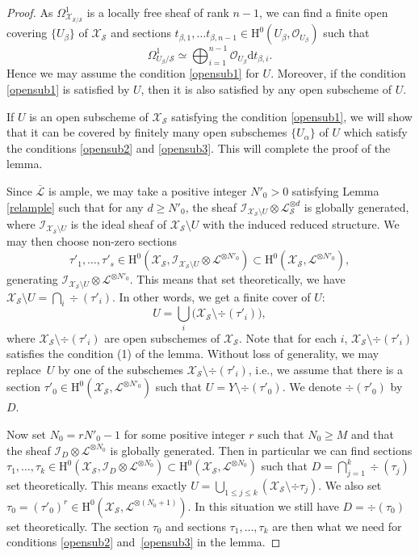 \documentclass[11pt]{article}
\newcommand{\ie}{i.e.,\xspace}
\numberwithin{equation}{section}
\theoremstyle{plain}
\theoremstyle{definition}
\newcommand{\ho}{\mathrm{H}}
\newcommand{\X}{\mathcal{X}}
\newcommand{\Li}{\overline{\mathcal{L}}{}}
\newcommand{\li}{\mathcal{L}}
\begin{document}
\begin{proof}[Proof]
As $\Omega^1_{\X_{\mathcal{S}/\mathcal{S}}}$ is a locally free sheaf of rank $n-1$,
we can find a finite open covering $\{U_{\beta}\}$ of $\X_{\mathcal{S}}$ and sections $t_{\beta,1},\dots t_{\beta,n-1}\in \ho^0(U_{\beta}, \mathcal{O}_{U_{\beta}})$ such that
\[
\Omega^1_{U_{\beta}/\mathcal{S}}\simeq \bigoplus_{i=1}^{n-1} \mathcal{O}_{U_{\beta}}\mathrm{d} t_{\beta,i}.
\]
Hence we may assume the condition \eqref{opensub1} for $U$. Moreover, if the condition \eqref{opensub1} is satisfied by $U$, then it is also satisfied by any open subscheme of $U$.

If $U$ is an open subscheme of $\X_{\mathcal{S}}$ satisfying the condition \eqref{opensub1}, we will show that it can be covered by finitely many open subschemes $\{U_{\alpha}\}$ of $U$ which satisfy the conditions \eqref{opensub2} and \eqref{opensub3}. This will complete the proof of the lemma.

Since $\Li$ is ample, we may take a positive integer $N'_0>0$ satisfying Lemma \ref{relample} such that for any $d\geq N'_0$, the sheaf $\mathcal{I}_{\X_{\mathcal{S}}\setminus U}\otimes \li_{\mathcal{S}}^{\otimes d}$ is globally generated, where $\mathcal{I}_{\X_{\mathcal{S}}\setminus U}$ is the ideal sheaf of $\X_{\mathcal{S}}\setminus U$ with the induced reduced structure. We may then choose non-zero sections
\[
\tau'_{1},\dots, \tau'_s\in \ho^0(\X_{\mathcal{S}}, \mathcal{I}_{\X_{\mathcal{S}}\setminus U}\otimes \li^{\otimes N'_0})\subset \ho^0(\X_{\mathcal{S}}, \li^{\otimes N'_0}),
\]
generating $\mathcal{I}_{\X_{\mathcal{S}}\setminus U}\otimes \li^{\otimes N'_0}$. This means that set theoretically, we have $\X_{\mathcal{S}}\setminus U=\bigcap_{i}\div (\tau'_i)$. In other words, we get a finite cover of $U$:
\[
U=\bigcup_{i}\big(\X_{\mathcal{S}}\setminus \div (\tau'_i) \big),
\]
where $\X_{\mathcal{S}}\setminus \div (\tau'_i)$ are open subschemes of $\X_{\mathcal{S}}$. Note that for each $i$, $\X_{\mathcal{S}}\setminus \div (\tau'_i)$ satisfies the condition (1) of the lemma. Without loss of generality, we may replace~$U$ by one of the subschemes $\X_{\mathcal{S}}\setminus \div (\tau'_i)$, \ie we assume that there is a section $\tau'_0\in \ho^0(\X_{\mathcal{S}}, \li^{\otimes N'_0})$ such that $U=Y\setminus\div (\tau'_0)$. We denote $\div (\tau'_0)$ by $D$.

Now set $N_0=r N'_0-1$ for some positive integer $r$ such that $N_0\geq M$ and that the sheaf $\mathcal{I}_D\otimes \li^{\otimes N_0}$ is globally generated. Then in particular we can find sections $\tau_1,\dots, \tau_k\in \ho^0(\X_{\mathcal{S}}, \mathcal{I}_D\otimes \li^{\otimes N_0})\subset \ho^0(\X_{\mathcal{S}}, \li^{\otimes N_0})$ such that $D=\bigcap_{j=1}^k\div (\tau_j)$ set theoretically. This means exactly $U=\bigcup_{1\leq j\leq k}(\X_{\mathcal{S}}\setminus \div \tau_{j})$. We also set $\tau_0=(\tau'_0)^r\in \ho^0(\X_{\mathcal{S}}, \li^{\otimes (N_0+1)})$. In this situation we still have $D=\div (\tau_0)$ set theoretically. The section $\tau_0$ and sections $\tau_1,\dots, \tau_k$ are then what we need for conditions \eqref{opensub2} and~\eqref{opensub3} in the lemma.
\end{proof}
\end{document}
